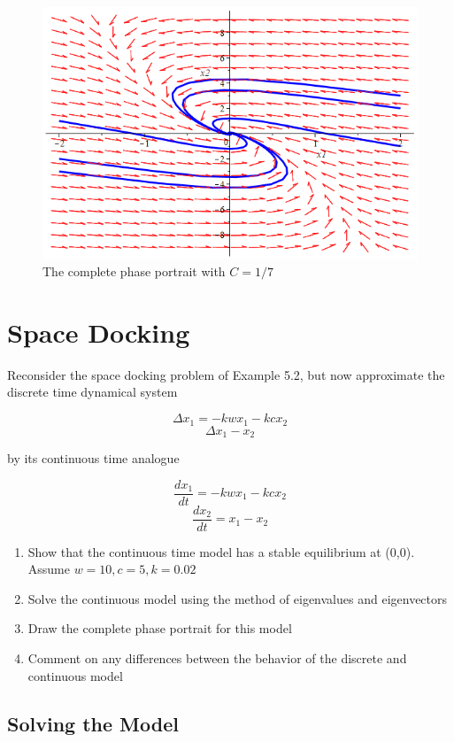 \documentclass[12pt]{report}
\begin{document}
\begin{figure}[h]
    \centering
    \includegraphics[width=5in]{complete1.png}
    \caption{The complete phase portrait with $C=1/7$}
    \label{fig:complete1}
\end{figure}

\chapter{Space Docking}


\begin{flushleft} 
Reconsider the space docking problem of Example 5.2, but now approximate the discrete time dynamical system 
\end{flushleft}
$$\Delta x_{1} = -kwx_{1} - kcx_{2}$$
$$\Delta x_{1} - x_{2}$$
\begin{flushleft} 
by its continuous time analogue
\end{flushleft} 
$$\dfrac{dx_{1}}{dt} = -kwx_{1} - kcx_{2}$$
$$\dfrac{dx_{2}}{dt} = x_{1} - x_{2}$$
\begin{enumerate}[label=(\alph*),ref=(\alph*)]
\item Show that the continuous time model has a stable equilibrium at (0,0). Assume $w = 10, c = 5, k = 0.02$
\item Solve the continuous model using the method of eigenvalues and eigenvectors
\item Draw the complete phase portrait for this model 
\item Comment on any differences between the behavior of the discrete and continuous model 
\end{enumerate} 

\section{Solving the Model}
\end{document}
